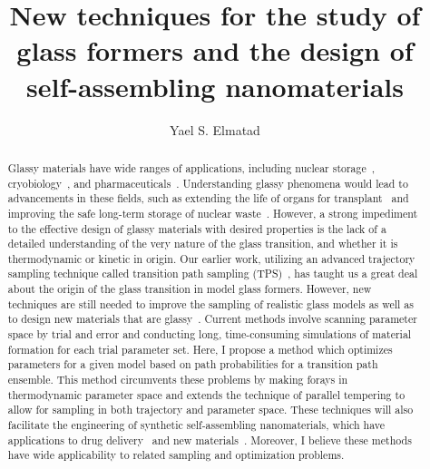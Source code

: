 \documentclass[11pt]{article}
\title{{New techniques for the study of glass formers and the design of self-assembling nanomaterials}}
\author{Yael S. Elmatad}
\date{}                                           %
\begin{document}
\maketitle
%
\begin{abstract}
Glassy materials have wide ranges of applications, including nuclear storage~\cite{Sales1984}, cryobiology~\cite{Lemler2004}, and pharmaceuticals~\cite{Craig1999}. Understanding glassy phenomena would lead to advancements in these fields, such as extending the life of organs for transplant~\cite{Lemler2004} and improving the safe long-term storage of nuclear waste~\cite{Sales1984}.  However, a strong impediment to the effective design of glassy materials with desired properties is the lack of a detailed understanding of the very nature of the glass transition, and whether it is thermodynamic or kinetic in origin. Our earlier work, utilizing an advanced trajectory sampling technique called transition path sampling (TPS)~\cite{Bolhuis_AnnuRevPhysChem_2002}, has taught us a great deal about the origin of the glass transition in model glass formers. However, new techniques are still needed to improve the sampling of realistic glass models as well as to design new materials that are glassy~\cite{Whitesides2002}. Current methods involve scanning parameter space by trial and error and conducting long, time-consuming simulations of material formation for each trial parameter set. Here, I propose a method which optimizes parameters for a given model based on path probabilities for a transition path ensemble.  This method circumvents these problems by making forays in thermodynamic parameter space and extends the technique of parallel tempering to allow for sampling in both trajectory and parameter space.  These techniques will also facilitate the engineering of synthetic self-assembling nanomaterials, which have applications to drug delivery~\cite{Rosler2001} and new materials~\cite{Whitesides2002}.   Moreover, I believe these methods have wide applicability to related sampling and optimization problems.
\end{abstract}
\end{document}

